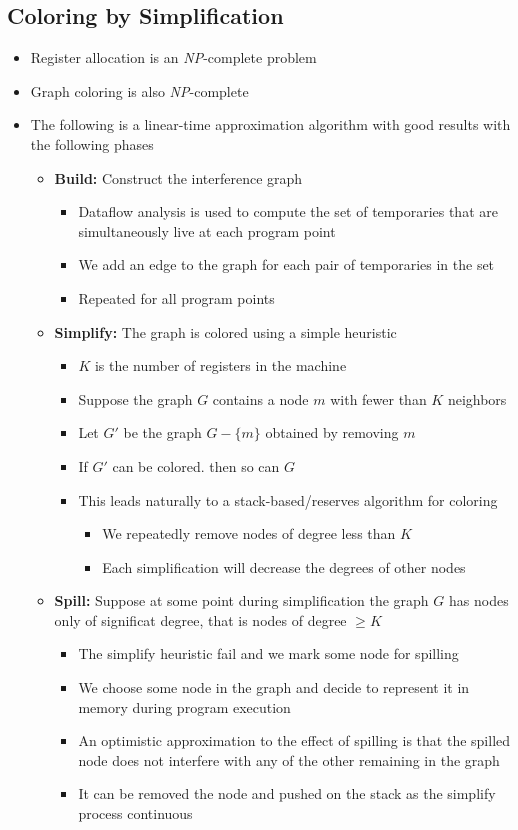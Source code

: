 \documentclass[11pt]{article}
\begin{document}
\subsection{Coloring by Simplification}
\label{sec:org5460ea4}
\begin{itemize}
\item Register allocation is an \emph{NP}-complete problem
\item Graph coloring is also \emph{NP}-complete

\item The following is a linear-time approximation algorithm with good results with the following phases
\begin{itemize}
\item \textbf{Build:} Construct the interference graph
\begin{itemize}
\item Dataflow analysis is used to compute the set of temporaries that are simultaneously live at each program point
\item We add an edge to the graph for each pair of temporaries in the set
\item Repeated for all program points
\end{itemize}

\item \textbf{Simplify:} The graph is colored using a simple heuristic
\begin{itemize}
\item \(K\) is the number of registers in the machine
\item Suppose the graph \(G\) contains a node \(m\) with fewer than \(K\) neighbors
\item Let \(G'\) be the graph \(G-\{m\}\) obtained by removing \(m\)
\item If \(G'\) can be colored. then so can \(G\)
\item This leads naturally to a stack-based/reserves algorithm for coloring
\begin{itemize}
\item We repeatedly remove nodes of degree less than \(K\)
\item Each simplification will decrease the degrees of other nodes
\end{itemize}
\end{itemize}

\item \textbf{Spill:} Suppose at some point during simplification the graph \(G\) has nodes only of significat degree, that is nodes of degree \(\geq K\)
\begin{itemize}
\item The simplify heuristic fail and we mark some node for spilling
\item We choose some node in the graph and decide to represent it in memory during program execution
\item An optimistic approximation to the effect of spilling is that the spilled node does not interfere with any of the other remaining in the graph
\item It can be removed the node and pushed on the stack as the simplify process continuous
\end{itemize}


\end{itemize}
\end{itemize}
\end{document}
